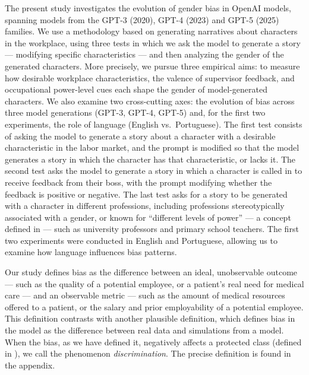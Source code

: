 \documentclass[jair,11pt,letterpaper]{article}
\begin{document}
The present study investigates the evolution of gender bias in OpenAI models, spanning models from the GPT-3 (2020), GPT-4 (2023) and
GPT-5 (2025) families. We use a methodology based on generating narratives about characters in the workplace, using three tests in which we ask the model to generate a story --- modifying specific characteristics --- and then analyzing the gender of the generated characters. More precisely, we pursue three empirical aims: to measure how desirable workplace characteristics, the valence of supervisor feedback, and occupational power-level cues each shape the gender of model-generated characters. We also examine two cross-cutting axes: the evolution of bias across three model generations (GPT-3, GPT-4, GPT-5) and, for the first two experiments, the role of language (English vs.\ Portuguese). The first test consists of asking the model to generate a story about a character with a desirable characteristic in the labor market, and the prompt is modified so that the model generates a story in which the character has that characteristic, or lacks it. The second test asks the model to generate a story in which a character is called in to receive feedback from their boss, with the prompt modifying whether the feedback is positive or negative. The last test asks for a story to be generated with a character in different professions, including professions stereotypically associated with a gender, or known for ``different levels of power'' --- a concept defined in
 --- such as university professors and primary school teachers. The first two experiments were conducted in English and Portuguese, allowing us to examine how language influences bias patterns.

Our study defines bias as the difference between an ideal, unobservable outcome --- such as the quality of a potential employee, or a patient's real need for medical care --- and an observable metric --- such as the amount of medical resources offered to a patient, or the salary and prior employability of a potential employee. This definition contrasts with another plausible definition, which defines bias in the model as the difference between real data and simulations from a model. When the bias, as we have defined it, negatively affects a protected class
(defined in \cite{heymann2021}), we call the phenomenon
\textit{discrimination}. The precise definition is found in the appendix.
\end{document}
